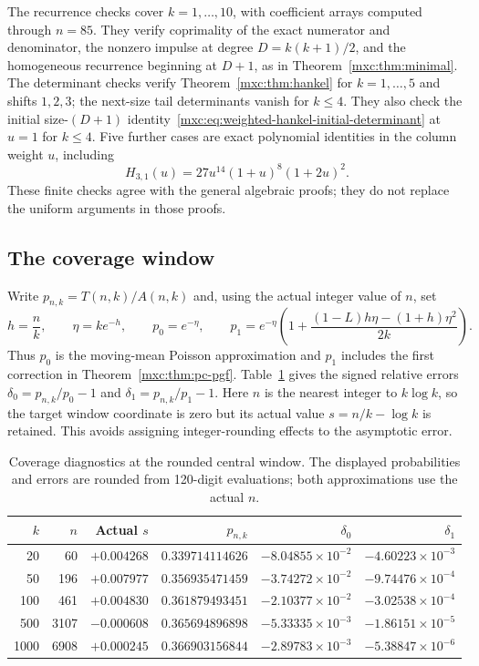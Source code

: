 \documentclass[11pt]{article}
\numberwithin{equation}{section}
\theoremstyle{definition}
\theoremstyle{remark}
\begin{document}
The recurrence checks cover $k=1,\ldots,10$, with coefficient arrays
computed through $n=85$. They verify coprimality of the exact numerator
and denominator, the nonzero impulse at degree $D=k(k+1)/2$, and the
homogeneous recurrence beginning at $D+1$, as in
Theorem~\ref{mxc:thm:minimal}. The determinant checks verify
Theorem~\ref{mxc:thm:hankel} for $k=1,\ldots,5$ and shifts $1,2,3$;
the next-size tail determinants vanish for $k\le4$. They also check
the initial size-$(D+1)$ identity~\eqref{mxc:eq:weighted-hankel-initial-determinant}
at $u=1$ for $k\le4$. Five further cases are exact polynomial
identities in the column weight $u$, including
\[
 H_{3,1}(u)=27u^{14}(1+u)^8(1+2u)^2.
\]
These finite checks agree with the general algebraic proofs; they do not
replace the uniform arguments in those proofs.

\subsection{The coverage window}
Write $p_{n,k}=T(n,k)/A(n,k)$ and, using the actual integer value of $n$,
set
\[
 h=\frac nk,\qquad \eta=ke^{-h},\qquad
 p_0=e^{-\eta},\qquad
 p_1=e^{-\eta}\left(1+
 \frac{(1-L)h\eta-(1+h)\eta^2}{2k}\right).
\]
Thus $p_0$ is the moving-mean Poisson approximation and $p_1$ includes
the first correction in Theorem~\ref{mxc:thm:pc-pgf}.
Table~\ref{mxc:tab:numeric-coverage} gives the signed relative errors
$\delta_0=p_{n,k}/p_0-1$ and $\delta_1=p_{n,k}/p_1-1$.
Here $n$ is the nearest integer to $k\log k$, so the target window
coordinate is zero but its actual value $s=n/k-\log k$ is retained.
This avoids assigning integer-rounding effects to the asymptotic error.

\begin{table}[htbp]
\centering\small
\begin{tabular}{@{}rrrrrr@{}}
\toprule
$k$ & $n$ & Actual $s$ & $p_{n,k}$ & $\delta_0$ & $\delta_1$\\
\midrule
20 & 60 & $+0.004268$ & $0.339714114626$ & $-8.04855\!\times\!10^{-2}$ & $-4.60223\!\times\!10^{-3}$\\
50 & 196 & $+0.007977$ & $0.356935471459$ & $-3.74272\!\times\!10^{-2}$ & $-9.74476\!\times\!10^{-4}$\\
100 & 461 & $+0.004830$ & $0.361879493451$ & $-2.10377\!\times\!10^{-2}$ & $-3.02538\!\times\!10^{-4}$\\
500 & 3107 & $-0.000608$ & $0.365694896898$ & $-5.33335\!\times\!10^{-3}$ & $-1.86151\!\times\!10^{-5}$\\
1000 & 6908 & $+0.000245$ & $0.366903156844$ & $-2.89783\!\times\!10^{-3}$ & $-5.38847\!\times\!10^{-6}$\\
\bottomrule
\end{tabular}
\caption{Coverage diagnostics at the rounded central window.
The displayed probabilities and errors are rounded from 120-digit
evaluations; both approximations use the actual $n$.}
\label{mxc:tab:numeric-coverage}
\end{table}
\end{document}
